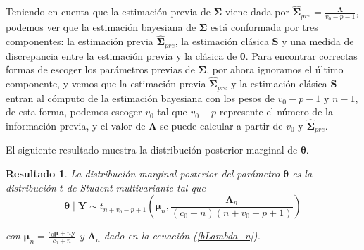 \documentclass[
  10pt,
  spanish,
]{book}
\newtheorem{proposition}{Resultado}[chapter]
\theoremstyle{definition}
\theoremstyle{definition}
\theoremstyle{definition}
\theoremstyle{definition}
\theoremstyle{remark}
\begin{document}
Teniendo en cuenta que la estimación previa de \(\boldsymbol \Sigma\) viene dada por \(\hat{\boldsymbol \Sigma}_{pre}=\frac{\boldsymbol \Lambda}{v_0-p-1}\), podemos ver que la estimación bayesiana de \(\boldsymbol \Sigma\) está conformada por tres componentes: la estimación previa \(\hat{\boldsymbol \Sigma}_{pre}\), la estimación clásica \(\mathbf{S}\) y una medida de discrepancia entre la estimación previa y la clásica de \(\boldsymbol \theta\). Para encontrar correctas formas de escoger los parámetros previas de \(\boldsymbol \Sigma\), por ahora ignoramos el último componente, y vemos que la estimación previa \(\hat{\boldsymbol \Sigma}_{pre}\) y la estimación clásica \(\mathbf{S}\) entran al cómputo de la estimación bayesiana con los pesos de \(v_0-p-1\) y \(n-1\), de esta forma, podemos escoger \(v_0\) tal que \(v_0-p\) represente el número de la información previa, y el valor de \(\boldsymbol \Lambda\) se puede calcular a partir de \(v_0\) y \(\hat{\boldsymbol \Sigma}_{pre}\).

El siguiente resultado muestra la distribución posterior marginal de \(\boldsymbol \theta\).

\begin{proposition}
\protect\hypertarget{prp:Posbtheta}{}{\label{prp:Posbtheta} }La distribución marginal posterior del parámetro \(\boldsymbol \theta\) es la distribución \(t\) de Student multivariante tal que
\begin{equation*}
\boldsymbol \theta\mid \mathbf{Y} \sim t_{n+v_0-p+1}\left(\boldsymbol \mu_n, \frac{\boldsymbol \Lambda_n}{(c_0+n)(n+v_0-p+1)}\right)
\end{equation*}

con \(\boldsymbol \mu_n=\frac{c_0\boldsymbol \mu+n\bar{\mathbf{y}}}{c_0+n}\) y \(\boldsymbol \Lambda_n\) dado en la ecuación (\ref{bLambda_n}).
\end{proposition}
\end{document}
